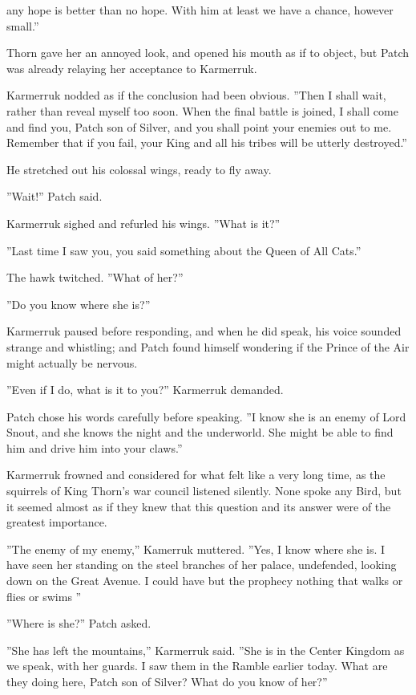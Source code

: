 \documentclass[11pt]{article}
\begin{document}
 any hope is better than no hope. With him at least we have a chance, however small.''\par
 Thorn gave her an annoyed look, and opened his mouth as if to object, but Patch was already relaying her acceptance to Karmerruk.\par
 Karmerruk nodded as if the conclusion had been obvious. ''Then I shall wait, rather than reveal myself too soon. When the final battle is joined, I shall come and find you, Patch son of Silver, and you shall point your enemies out to me. Remember that if you fail, your King and all his tribes will be utterly destroyed.''\par
 He stretched out his colossal wings, ready to fly away.\par
 ''Wait!'' Patch said.\par
 Karmerruk sighed and refurled his wings. ''What is it?''\par
 ''Last time I saw you, you said something about the Queen of All Cats.''\par
 The hawk twitched. ''What of her?''\par
 ''Do you know where she is?''\par
 Karmerruk paused before responding, and when he did speak, his voice sounded strange and whistling; and Patch found himself wondering if the Prince of the Air might actually be nervous.\par
''Even if I do, what is it to you?'' Karmerruk demanded.\par
 Patch chose his words carefully before speaking. ''I know she is an enemy of Lord Snout, and she knows the night and the underworld. She might be able to find him and drive him into your claws.''\par
 Karmerruk frowned and considered for what felt like a very long time, as the squirrels of King Thorn's war council listened silently. None spoke any Bird, but it seemed almost as if they knew that this question and its answer were of the greatest importance.\par
 ''The enemy of my enemy,'' Kamerruk muttered. ''Yes, I know where she is. I have seen her standing on the steel branches of her palace, undefended, looking down on the Great Avenue. I could have %
 but the prophecy %
 nothing that walks or flies or swims%
''\par
 ''Where is she?'' Patch asked.\par
 ''She has left the mountains,'' Karmerruk said. ''She is in the Center Kingdom as we speak, with her guards. I saw them in the Ramble earlier today. What are they doing here, Patch son of Silver? What do you know of her?''\par
\end{document}
